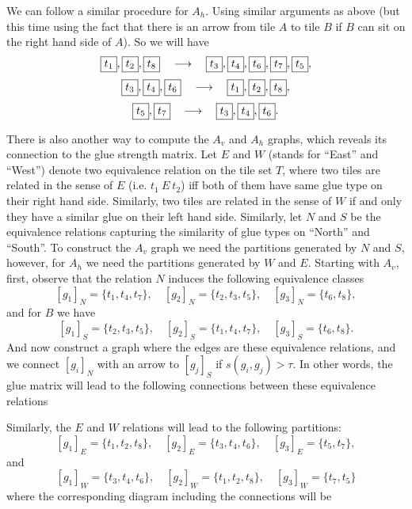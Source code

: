 \documentclass[11pt,a4paper]{article}
\newcommand{\tile}[1]{\fbox{\ensuremath{#1}}}
\theoremstyle{definition}
\theoremstyle{remark}
\theoremstyle{definition}
\begin{document}
	We can follow a similar procedure for $ A_h $. Using similar arguments as above (but this time using the fact that there is an arrow from tile $ A $ to tile $ B $ if $ B $ can sit on the right hand side of $ A $). So we will have
	\[ \tile{t_1},\tile{t_2},\tile{t_8} \quad\longrightarrow\quad \tile{t_3},\tile{t_4},\tile{t_6},\tile{t_7},\tile{t_5}, \]
	\[ \tile{t_3},\tile{t_4},\tile{t_6} \quad\longrightarrow\quad \tile{t_1},\tile{t_2},\tile{t_8}, \]
	\[ \tile{t_5},\tile{t_7} \quad\longrightarrow\quad \tile{t_3},\tile{t_4},\tile{t_6}. \]
	
	There is also another way to compute the $ A_v $ and $ A_h $ graphs, which reveals its connection to the glue strength matrix.  Let $ E $ and $ W $ (stands for ``East'' and ``West'') denote two equivalence relation on the tile set $ T $, where two tiles are related in the sense of $ E $ (i.e. $ t_1\ E\ t_2 $) iff both of them have same glue type on their right hand side. Similarly, two tiles are related in the sense of $ W $ if and only they have a similar glue on their left hand side. Similarly, let $ N $ and $ S $ be the equivalence relations capturing the similarity of glue types on ``North'' and ``South''. To construct the $ A_v $ graph we need the partitions generated by $ N $ and $ S $, however, for $ A_h $ we need the partitions generated by $ W $ and $ E $. Starting with $ A_v $, first, observe that the relation $ N $ induces the following equivalence classes
	\[ [g_1]_N = \{t_1,t_4,t_7\}, \quad [g_2]_N = \{t_2,t_3,t_5\}, \quad [g_3]_N = \{t_6, t_8\}, \] 
	and for $ B $ we have
	\[ [g_1]_S = \{t_2,t_3,t_5\}, \quad [g_2]_S = \{t_1,t_4,t_7\}, \quad [g_3]_S = \{t_6,t_8\}. \]
	And now construct a graph where the edges are these equivalence relations, and we connect $ [g_i]_N $ with an arrow to $ [g_j]_S $ if $ s(g_i,g_j) > \tau $. In other words, the glue matrix will lead to the following connections between these equivalence relations
	
	\FloatBarrier
	Similarly, the $ E $ and $ W $ relations will lead to the following partitions:
	\[ [g_1]_E = \{t_1,t_2,t_8\}, \quad [g_2]_E = \{t_3,t_4,t_6\}, \quad [g_3]_E = \{t_5,t_7\}, \]
	and
	\[ [g_1]_W = \{t_3,t_4,t_6\}, \quad [g_2]_W = \{t_1,t_2,t_8\}, \quad [g_3]_W = \{t_7, t_5\} \]
	where the corresponding diagram including the connections will be
	
	
\end{document}
